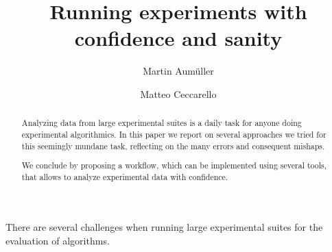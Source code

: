 \documentclass{llncs}
\begin{document}
\title{Running experiments with confidence and sanity}
%
%
\author{
  Martin Aumüller \and
  Matteo Ceccarello}
%
%
%
\maketitle              %
%
\begin{abstract}
Analyzing data from large experimental suites is a daily task for
anyone doing experimental algorithmics.
In this paper we report on several approaches we tried for this 
seemingly mundane task, reflecting on the many errors and consequent
mishaps.

We conclude by proposing a workflow, which can be implemented using several
tools, that allows to analyze experimental data with confidence.

\end{abstract}

There are several challenges when running large experimental suites
for the evaluation of algorithms.
\end{document}
